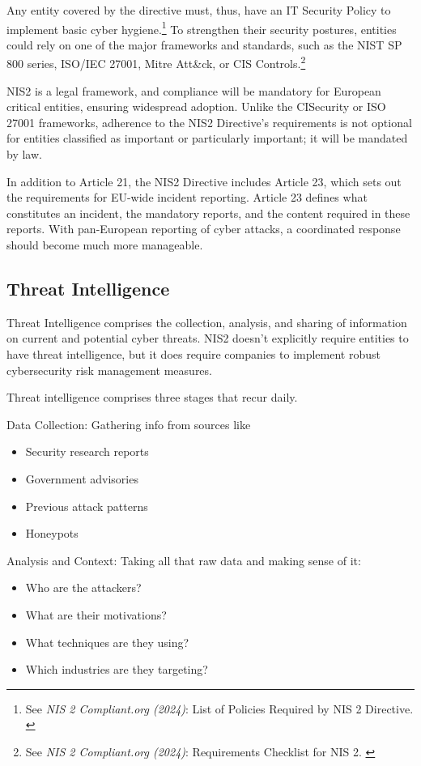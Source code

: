 Any entity covered by the directive must, thus, have an IT Security Policy to implement basic cyber hygiene.\footnote{See \textit{NIS 2 Compliant.org (2024)}: List of Policies Required by NIS 2 Directive. \cite{nisPols}} To strengthen their security postures, entities could rely on one of the major frameworks and standards, such as the NIST SP 800 series, ISO/IEC 27001, Mitre Att\&ck, or CIS Controls.\footnote{See \textit{NIS 2 Compliant.org (2024)}: Requirements Checklist for NIS 2. \cite{nisReqs}}

NIS2 is a legal framework, and compliance will be mandatory for European critical entities, ensuring widespread adoption. Unlike the CISecurity or ISO 27001 frameworks, adherence to the NIS2 Directive's requirements is not optional for entities classified as important or particularly important; it will be mandated by law.

In addition to Article 21, the NIS2 Directive includes Article 23, which sets out the requirements for EU-wide incident reporting. Article 23 defines what constitutes an incident, the mandatory reports, and the content required in these reports. With pan-European reporting of cyber attacks, a coordinated response should become much more manageable.

\subsection{Threat Intelligence}\label{threat-intelligence}

Threat Intelligence comprises the collection, analysis, and sharing of information on current and potential cyber threats. NIS2 doesn't explicitly require entities to have threat intelligence, but it does require companies to implement robust cybersecurity risk management measures.

Threat intelligence comprises three stages that recur daily.

Data Collection: Gathering info from sources like
\begin{itemize}
    \item Security research reports
    \item Government advisories
    \item Previous attack patterns
    \item Honeypots
\end{itemize}

Analysis and Context: Taking all that raw data and making sense of it:
\begin{itemize}
    \item Who are the attackers?
    \item What are their motivations?
    \item What techniques are they using?
    \item Which industries are they targeting?
\end{itemize}

